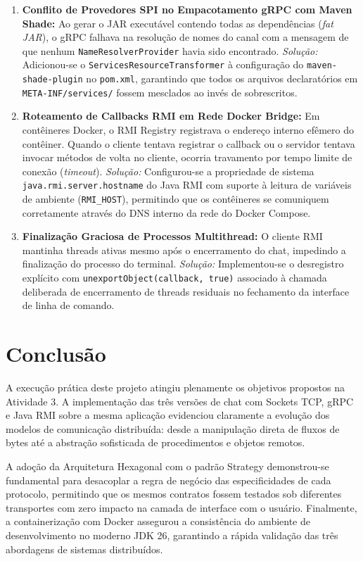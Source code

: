 \documentclass[12pt,a4paper]{article}
\begin{document}
\begin{enumerate}
    \item \textbf{Conflito de Provedores SPI no Empacotamento gRPC com Maven Shade:}
    Ao gerar o JAR executável contendo todas as dependências (\textit{fat JAR}), o gRPC falhava na resolução de nomes do canal com a mensagem de que nenhum \texttt{NameResolverProvider} havia sido encontrado. 
    \textit{Solução:} Adicionou-se o \texttt{ServicesResourceTransformer} à configuração do \texttt{maven-shade-plugin} no \texttt{pom.xml}, garantindo que todos os arquivos declaratórios em \texttt{META-INF/services/} fossem mesclados ao invés de sobrescritos.
    
    \item \textbf{Roteamento de Callbacks RMI em Rede Docker Bridge:}
    Em contêineres Docker, o RMI Registry registrava o endereço interno efêmero do contêiner. Quando o cliente tentava registrar o callback ou o servidor tentava invocar métodos de volta no cliente, ocorria travamento por tempo limite de conexão (\textit{timeout}).
    \textit{Solução:} Configurou-se a propriedade de sistema \texttt{java.rmi.server.hostname} do Java RMI com suporte à leitura de variáveis de ambiente (\texttt{RMI\_HOST}), permitindo que os contêineres se comuniquem corretamente através do DNS interno da rede do Docker Compose.
    
    \item \textbf{Finalização Graciosa de Processos Multithread:}
    O cliente RMI mantinha threads ativas mesmo após o encerramento do chat, impedindo a finalização do processo do terminal.
    \textit{Solução:} Implementou-se o desregistro explícito com \texttt{unexportObject(callback, true)} associado à chamada deliberada de encerramento de threads residuais no fechamento da interface de linha de comando.
\end{enumerate}

\section{Conclusão}

A execução prática deste projeto atingiu plenamente os objetivos propostos na Atividade 3. A implementação das três versões de chat com Sockets TCP, gRPC e Java RMI sobre a mesma aplicação evidenciou claramente a evolução dos modelos de comunicação distribuída: desde a manipulação direta de fluxos de bytes até a abstração sofisticada de procedimentos e objetos remotos.

A adoção da Arquitetura Hexagonal com o padrão Strategy demonstrou-se fundamental para desacoplar a regra de negócio das especificidades de cada protocolo, permitindo que os mesmos contratos fossem testados sob diferentes transportes com zero impacto na camada de interface com o usuário. Finalmente, a containerização com Docker assegurou a consistência do ambiente de desenvolvimento no moderno JDK 26, garantindo a rápida validação das três abordagens de sistemas distribuídos.
\end{document}
